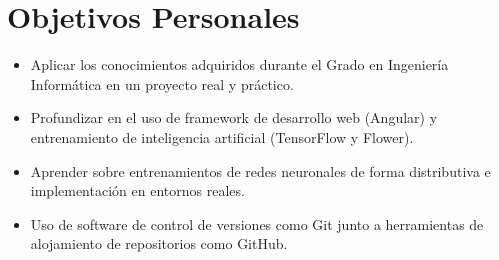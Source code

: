 \section{Objetivos Personales}
\label{sec:ObjetivosPersonales}
\begin{itemize}
    \item Aplicar los conocimientos adquiridos durante el Grado en Ingeniería Informática en un proyecto real y práctico.
    \item Profundizar en el uso de framework de desarrollo web (Angular) y entrenamiento de inteligencia artificial (TensorFlow y Flower).
    \item Aprender sobre entrenamientos de redes neuronales de forma distributiva e implementación en entornos reales.
    \item Uso de software de control de versiones como Git junto a herramientas de alojamiento de repositorios como GitHub.    
\end{itemize}
